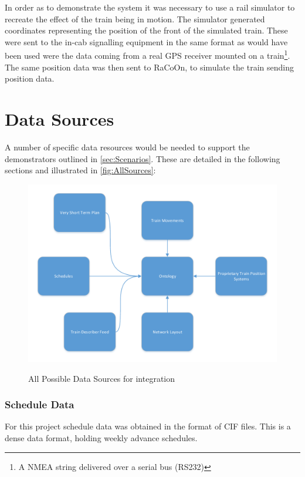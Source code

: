 In order as to demonstrate the system it was necessary to use a rail simulator to recreate the effect of the train being in motion. The simulator generated coordinates representing the position of the front of the simulated train. These were sent to the in-cab signalling equipment in the same format as would have been used were the data coming from a real GPS receiver mounted on a train\footnote{A NMEA string delivered over a serial bus (RS232)}. The same position data was then sent to RaCoOn, to simulate the train sending position data. 


\section{Data Sources}

A number of specific data resources would be needed to support the demonstrators outlined in \autoref{sec:Scenarios}. These are detailed in the following sections and illustrated in \autoref{fig:AllSources}:

\begin{figure}[h]
\myfloatalign
{\includegraphics[width=\linewidth]{gfx/DataflowStirAllOptionsDemo}} 
\caption{All Possible Data Sources for integration}
\label{fig:AllSources}
\end{figure}


\subsubsection{Schedule Data}
For this project schedule data was obtained in the format of CIF files. This is a dense data format, holding weekly advance schedules.

